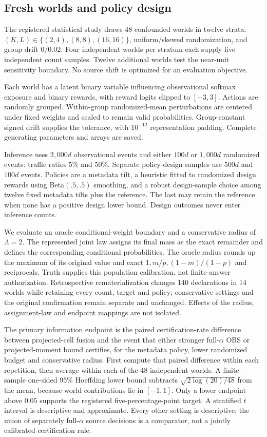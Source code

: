 \documentclass[conference]{IEEEtran}
\begin{document}
\subsection{Fresh worlds and policy design}
The registered statistical study draws 48 confounded worlds in twelve strata: $(K,L)\in\{(2,4),(8,8),(16,16)\}$, uniform/skewed randomization, and group drift $0/0.02$. Four independent worlds per stratum each supply five independent count samples. Twelve additional worlds test the near-unit sensitivity boundary. No source shift is optimized for an evaluation objective.

Each world has a latent binary variable influencing observational softmax exposure and binary rewards, with reward logits clipped to $[-3,3]$. Actions are randomly grouped. Within-group randomized-mean perturbations are centered under fixed weights and scaled to remain valid probabilities. Group-constant signed drift supplies the tolerance, with $10^{-12}$ representation padding. Complete generating parameters and arrays are saved.

Inference uses $2{,}000d$ observational events and either $100d$ or $1{,}000d$ randomized events: traffic ratios $5\%$ and $50\%$. Separate policy-design samples use $500d$ and $100d$ events. Policies are a metadata tilt, a heuristic fitted to randomized design rewards using Beta$(.5,.5)$ smoothing, and a robust design-sample choice among twelve fixed metadata tilts plus the reference. The last may retain the reference when none has a positive design lower bound. Design outcomes never enter inference counts.

We evaluate an oracle conditional-weight boundary and a conservative radius of $\Lambda=2$. The represented joint law assigns its final mass as the exact remainder and defines the corresponding conditional probabilities. The oracle radius rounds up the maximum of its original value and exact $1,m/p,(1-m)/(1-p)$ and reciprocals. Truth supplies this population calibration, not finite-answer authorization. Retrospective rematerialization changes 140 declarations in 14 worlds while retaining every count, target and policy; conservative settings and the original confirmation remain separate and unchanged. Effects of the radius, assignment-law and endpoint mappings are not isolated.

The primary information endpoint is the paired certification-rate difference between projected-cell fusion and the event that either stronger full-$\alpha$ OBS or projected-moment bound certifies, for the metadata policy, lower randomized budget and conservative radius. First compute that paired difference within each repetition, then average within each of the 48 independent worlds. A finite-sample one-sided $95\%$ Hoeffding lower bound subtracts $\sqrt{2\log(20)/48}$ from the mean, because world contributions lie in $[-1,1]$. Only a lower endpoint above $0.05$ supports the registered five-percentage-point target. A stratified $t$ interval is descriptive and approximate. Every other setting is descriptive; the union of separately full-$\alpha$ source decisions is a comparator, not a jointly calibrated certification rule.
\end{document}
